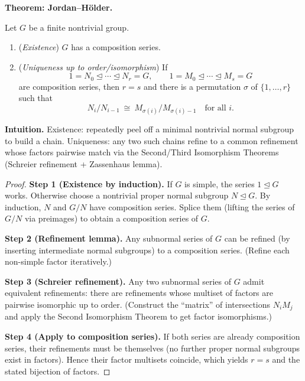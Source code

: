 \documentclass[9pt]{article}
\theoremstyle{definition}
\begin{document}
\noindent\textbf{Theorem: Jordan–Hölder.}

\newpage

Let $G$ be a finite nontrivial group.
\begin{enumerate}
  \item (\emph{Existence}) $G$ has a composition series.
  \item (\emph{Uniqueness up to order/isomorphism}) If 
  \[
  1=N_0\trianglelefteq\cdots\trianglelefteq N_r=G,\qquad
  1=M_0\trianglelefteq\cdots\trianglelefteq M_s=G
  \]
  are composition series, then $r=s$ and there is a permutation $\sigma$ of $\{1,\dots,r\}$ such that
  \[
  N_i/N_{i-1}\ \cong\ M_{\sigma(i)}/M_{\sigma(i)-1}\quad\text{for all }i.
  \]
\end{enumerate}

\dotfill

\noindent\textbf{Intuition.}
Existence: repeatedly peel off a minimal nontrivial normal subgroup to build a chain. Uniqueness: any two such chains refine to a common refinement whose factors pairwise match via the Second/Third Isomorphism Theorems (Schreier refinement + Zassenhaus lemma).

\dotfill

\begin{proof}
\textbf{Step 1 (Existence by induction).} If $G$ is simple, the series $1\trianglelefteq G$ works. Otherwise choose a nontrivial proper normal subgroup $N\trianglelefteq G$. By induction, $N$ and $G/N$ have composition series. Splice them (lifting the series of $G/N$ via preimages) to obtain a composition series of $G$.

\textbf{Step 2 (Refinement lemma).} Any subnormal series of $G$ can be refined (by inserting intermediate normal subgroups) to a composition series. (Refine each non-simple factor iteratively.)

\textbf{Step 3 (Schreier refinement).} Any two subnormal series of $G$ admit equivalent refinements: there are refinements whose multiset of factors are pairwise isomorphic up to order. (Construct the “matrix” of intersections $N_iM_j$ and apply the Second Isomorphism Theorem to get factor isomorphisms.)

\textbf{Step 4 (Apply to composition series).} If both series are already composition series, their refinements must be themselves (no further proper normal subgroups exist in factors). Hence their factor multisets coincide, which yields $r=s$ and the stated bijection of factors.
\end{proof}
\end{document}
